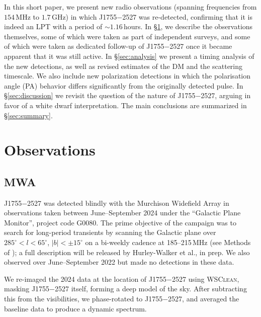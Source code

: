 \documentclass[fleqn,usenatbib]{mnras}
\newcommand{\src}{J1755$-$2527}
\begin{document}
In this short paper, we present new radio observations (spanning frequencies from $154\,$MHz to $1.7\,$GHz) in which \src{} was re-detected, confirming that it is indeed an LPT with a period of ${\sim}1.16\,$hours.
In \S\ref{sec:observations}, we describe the observations themselves, some of which were taken as part of independent surveys, and some of which were taken as dedicated follow-up of \src{} once it became apparent that it was still active.
In \S\ref{sec:analysis} we present a timing analysis of the new detections, as well as revised estimates of the DM and the scattering timescale.
We also include new polarization detections in which the polarisation angle (PA) behavior differs significantly from the originally detected pulse.
In \S\ref{sec:discussion} we revisit the question of the nature of \src{}, arguing in favor of a white dwarf interpretation.
The main conclusions are summarized in \S\ref{sec:summary}.

\section{Observations} \label{sec:observations}

\subsection{MWA} \label{sec:mwa}

\src{} was detected blindly with the Murchison Widefield Array \citep[MWA;][]{Tingay2013} in observations taken between June--September 2024 under the ``Galactic Plane Monitor'', project code G0080. The prime objective of the campaign was to search for long-period transients by scanning the Galactic plane over $285^\circ < l < 65^\circ$, $|b|<\pm15^\circ$ on a bi-weekly cadence at 185--215\,MHz (see Methods of \citet{2023Natur.619..487H}); a full description will be released by Hurley-Walker et al., in prep. We also observed over June--September 2022 but made no detections in these data.

We re-imaged the 2024 data at the location of \src{} using \textsc{WSClean}, masking \src{} itself, forming a deep model of the sky. After subtracting this from the visibilities, we phase-rotated to \src{}, and averaged the baseline data to produce a dynamic spectrum.
\end{document}
